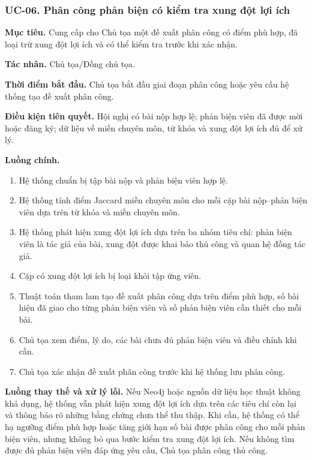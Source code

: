\subsubsection{UC-06. Phân công phản biện có kiểm tra xung đột lợi ích}

\textbf{Mục tiêu.} Cung cấp cho Chủ tọa một đề xuất phân công có điểm phù hợp, đã loại trừ xung đột lợi ích và có thể kiểm tra trước khi xác nhận.

\textbf{Tác nhân.} Chủ tọa/Đồng chủ tọa.

\textbf{Thời điểm bắt đầu.} Chủ tọa bắt đầu giai đoạn phân công hoặc yêu cầu hệ thống tạo đề xuất phân công.

\textbf{Điều kiện tiên quyết.} Hội nghị có bài nộp hợp lệ; phản biện viên đã được mời hoặc đăng ký; dữ liệu về miền chuyên môn, từ khóa và xung đột lợi ích đủ để xử lý.

\textbf{Luồng chính.}

\begin{enumerate}
  \item Hệ thống chuẩn bị tập bài nộp và phản biện viên hợp lệ.
  \item Hệ thống tính điểm Jaccard miền chuyên môn cho mỗi cặp bài nộp--phản biện viên dựa trên từ khóa và miền chuyên môn.
  \item Hệ thống phát hiện xung đột lợi ích dựa trên ba nhóm tiêu chí: phản biện viên là tác giả của bài, xung đột được khai báo thủ công và quan hệ đồng tác giả.
  \item Cặp có xung đột lợi ích bị loại khỏi tập ứng viên.
  \item Thuật toán tham lam tạo đề xuất phân công dựa trên điểm phù hợp, số bài hiện đã giao cho từng phản biện viên và số phản biện viên cần thiết cho mỗi bài.
  \item Chủ tọa xem điểm, lý do, các bài chưa đủ phản biện viên và điều chỉnh khi cần.
  \item Chủ tọa xác nhận đề xuất phân công trước khi hệ thống lưu phân công.
\end{enumerate}

\textbf{Luồng thay thế và xử lý lỗi.} Nếu Neo4j hoặc nguồn dữ liệu học thuật không khả dụng, hệ thống vẫn phát hiện xung đột lợi ích dựa trên các tiêu chí còn lại và thông báo rõ những bằng chứng chưa thể thu thập. Khi cần, hệ thống có thể hạ ngưỡng điểm phù hợp hoặc tăng giới hạn số bài được phân công cho mỗi phản biện viên, nhưng không bỏ qua bước kiểm tra xung đột lợi ích. Nếu không tìm được đủ phản biện viên đáp ứng yêu cầu, Chủ tọa phân công thủ công.

